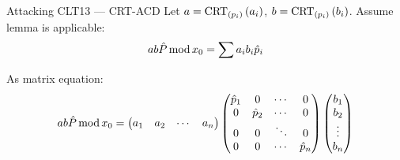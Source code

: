 \documentclass[english]{beamer}
\begin{document}
    \begin{frame}{Attacking CLT13 --- CRT-ACD}
        Let $a = \operatorname{CRT}_{(p_{i})}\left(a_i\right)$, $b = \operatorname{CRT}_{(p_{i})}\left(b_i\right)$. Assume lemma is applicable:
        \begin{equation*}
            ab\hat{P} \operatorname{mod} x_0 = \sum a_i b_i \hat{p}_i
        \end{equation*}
        \pause

        As matrix equation:
        \begin{equation*}
            ab\hat{P} \operatorname{mod} x_0 =
            \begin{pmatrix}
                a_1 & a_2 & \cdots & a_n
            \end{pmatrix}
            \begin{pmatrix}
                \hat{p}_1 & 0 & \cdots & 0 \\
                0 & \hat{p}_2 & \cdots & 0 \\
                0 & 0 & \ddots & 0 \\
                0 & 0 & \cdots & \hat{p}_n
            \end{pmatrix}
            \begin{pmatrix}
                b_1 \\
                b_2 \\
                \vdots \\
                b_n
            \end{pmatrix}
        \end{equation*}
    \end{frame}
\end{document}
